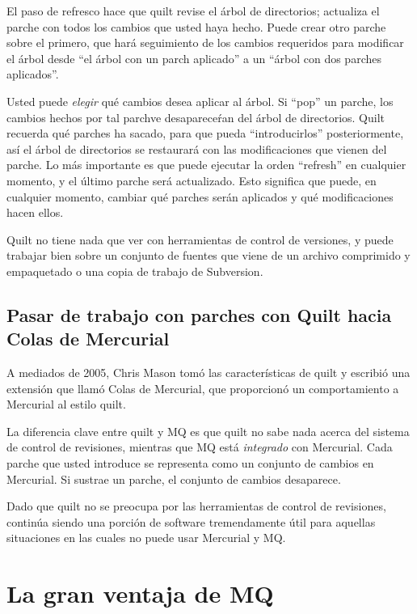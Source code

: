 El paso de refresco hace que quilt revise el árbol de directorios;
actualiza el parche con todos los cambios que usted haya hecho.  Puede
crear otro parche sobre el primero, que hará seguimiento de los
cambios requeridos para modificar el árbol desde ``el árbol con un
parch aplicado'' a un ``árbol con dos parches aplicados''.

Usted puede \emph{elegir} qué cambios desea aplicar al árbol.  Si
``pop'' un parche, los cambios hechos por tal parchve
desapareceŕan del árbol de directorios.  Quilt recuerda qué parches ha
sacado, para que pueda ``introducirlos'' posteriormente, así el
árbol de directorios se restaurará con las modificaciones que vienen
del parche.  Lo más importante es que puede ejecutar la orden
``refresh'' en cualquier momento, y el último parche será
actualizado.  Esto significa que puede, en cualquier momento, cambiar
qué parches serán aplicados y qué modificaciones hacen ellos.

Quilt no tiene nada que ver con herramientas de control de versiones,
y puede trabajar bien sobre un conjunto de fuentes que viene de un
archivo comprimido y empaquetado o una copia de trabajo de Subversion.

\subsection{Pasar de trabajo con parches con Quilt hacia Colas de Mercurial}
\label{sec:mq:quilt-mq}

A mediados de 2005, Chris Mason tomó las características de quilt y
escribió una extensión que llamó Colas de Mercurial, que proporcionó un comportamiento a Mercurial al estilo
quilt.

La diferencia clave entre quilt y MQ es que quilt no sabe nada acerca
del sistema de control de revisiones, mientras que MQ está
\emph{integrado} con Mercurial.  Cada parche que usted introduce se
representa como un conjunto de cambios en Mercurial.  Si sustrae un
parche, el conjunto de cambios desaparece.

Dado que quilt no se preocupa por las herramientas de control de
revisiones, continúa siendo una porción de software tremendamente útil
para aquellas situaciones en las cuales no puede usar Mercurial y MQ.

\section{La gran ventaja de MQ}

